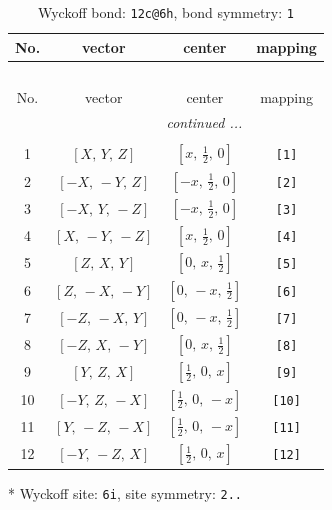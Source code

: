 \documentclass[fleqn,8pt]{jsarticle}
\begin{document}
\begin{longtable}{cccc}
\caption{Wyckoff bond: {\tt 12c@6h}, bond symmetry: {\tt 1}}
 \\
 \hline \hline
No. & vector & center & mapping \\ \hline \endfirsthead

\multicolumn{3}{l}{\tablename\ \thetable{}} \\
 \hline \hline
No. & vector & center & mapping \\ \hline \endhead

 \hline \hline
\multicolumn{3}{r}{\footnotesize\it continued ...} \\ \endfoot

 \hline \hline
\multicolumn{3}{r}{} \\ \endlastfoot

1 & $\left[ X,\, Y,\, Z \right]$ & $\left[ x,\, \frac{1}{2},\, 0 \right]$ & {\tt [1]} \\ \hline
2 & $\left[ - X,\, - Y,\, Z \right]$ & $\left[ - x,\, \frac{1}{2},\, 0 \right]$ & {\tt [2]} \\ \hline
3 & $\left[ - X,\, Y,\, - Z \right]$ & $\left[ - x,\, \frac{1}{2},\, 0 \right]$ & {\tt [3]} \\ \hline
4 & $\left[ X,\, - Y,\, - Z \right]$ & $\left[ x,\, \frac{1}{2},\, 0 \right]$ & {\tt [4]} \\ \hline
5 & $\left[ Z,\, X,\, Y \right]$ & $\left[ 0,\, x,\, \frac{1}{2} \right]$ & {\tt [5]} \\ \hline
6 & $\left[ Z,\, - X,\, - Y \right]$ & $\left[ 0,\, - x,\, \frac{1}{2} \right]$ & {\tt [6]} \\ \hline
7 & $\left[ - Z,\, - X,\, Y \right]$ & $\left[ 0,\, - x,\, \frac{1}{2} \right]$ & {\tt [7]} \\ \hline
8 & $\left[ - Z,\, X,\, - Y \right]$ & $\left[ 0,\, x,\, \frac{1}{2} \right]$ & {\tt [8]} \\ \hline
9 & $\left[ Y,\, Z,\, X \right]$ & $\left[ \frac{1}{2},\, 0,\, x \right]$ & {\tt [9]} \\ \hline
10 & $\left[ - Y,\, Z,\, - X \right]$ & $\left[ \frac{1}{2},\, 0,\, - x \right]$ & {\tt [10]} \\ \hline
11 & $\left[ Y,\, - Z,\, - X \right]$ & $\left[ \frac{1}{2},\, 0,\, - x \right]$ & {\tt [11]} \\ \hline
12 & $\left[ - Y,\, - Z,\, X \right]$ & $\left[ \frac{1}{2},\, 0,\, x \right]$ & {\tt [12]} \\
\end{longtable}
* Wyckoff site: {\tt 6i}, site symmetry: {\tt 2..}
\end{document}
